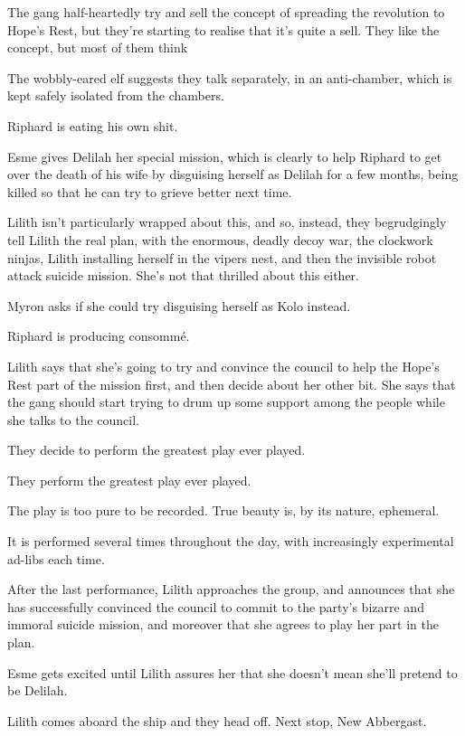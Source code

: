 The gang half-heartedly try and sell the concept of spreading the revolution to Hope’s Rest, but they’re starting to realise that it’s quite a sell. They like the concept, but most of them think\medskip

The wobbly-eared elf suggests they talk separately, in an anti-chamber, which is kept safely isolated from the chambers.\medskip

Riphard is eating his own shit.\medskip

Esme gives Delilah her special mission, which is clearly to help Riphard to get over the death of his wife by disguising herself as Delilah for a few months, being killed so that he can try to grieve better next time.\medskip

Lilith isn’t particularly wrapped about this, and so, instead, they begrudgingly tell Lilith the real plan, with the enormous, deadly decoy war, the clockwork ninjas, Lilith installing herself in the vipers nest, and then the invisible robot attack suicide mission. She’s not that thrilled about this either.\medskip

Myron asks if she could try disguising herself as Kolo instead.\medskip

Riphard is producing consommé.\medskip

Lilith says that she’s going to try and convince the council to help the Hope’s Rest part of the mission first, and then decide about her other bit. She says that the gang should start trying to drum up some support among the people while she talks to the council.\medskip

They decide to perform the greatest play ever played.\medskip

They perform the greatest play ever played.\medskip

The play is too pure to be recorded. True beauty is, by its nature, ephemeral.\medskip

It is performed several times throughout the day, with increasingly experimental ad-libs each time.\medskip

After the last performance, Lilith approaches the group, and announces that she has successfully convinced the council to commit to the party’s bizarre and immoral suicide mission, and moreover that she agrees to play her part in the plan.\medskip

Esme gets excited until Lilith assures her that she doesn’t mean she’ll pretend to be Delilah.\medskip

Lilith comes aboard the ship and they head off. Next stop, New Abbergast.\medskip

\vspace*{5mm}

